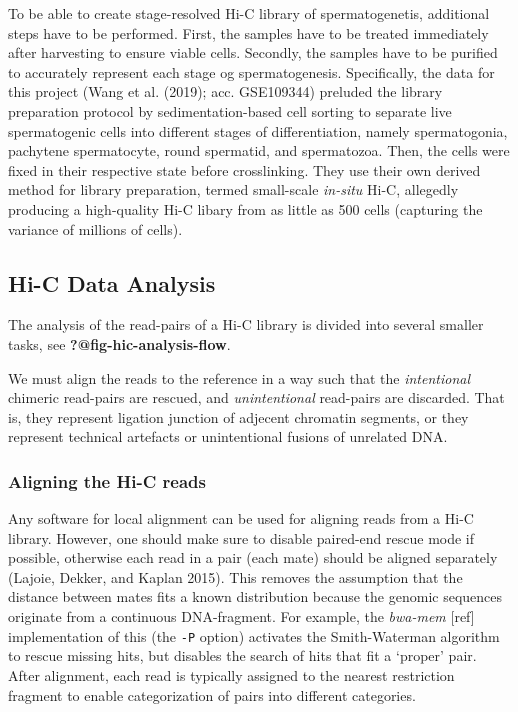 \documentclass[
  11pt,
  a4paper,
]{scrbook}
\let\oldemph\emph
\renewcommand\emph[1]{\oldemph{\color{gray}#1}}
\begin{document}
To be able to create stage-resolved Hi-C library of spermatogenetis,
additional steps have to be performed. First, the samples have to be
treated immediately after harvesting to ensure viable cells. Secondly,
the samples have to be purified to accurately represent each stage og
spermatogenesis. Specifically, the data for this project (Wang et al.
(2019); acc. GSE109344) preluded the library preparation protocol by
sedimentation-based cell sorting to separate live spermatogenic cells
into different stages of differentiation, namely spermatogonia,
pachytene spermatocyte, round spermatid, and spermatozoa. Then, the
cells were fixed in their respective state before crosslinking. They use
their own derived method for library preparation, termed small-scale
\emph{in-situ} Hi-C, allegedly producing a high-quality Hi-C libary from
as little as 500 cells (capturing the variance of millions of cells).

\subsection{Hi-C Data Analysis}\label{hi-c-data-analysis}

The analysis of the read-pairs of a Hi-C library is divided into several
smaller tasks, see \textbf{?@fig-hic-analysis-flow}.

We must align the reads to the reference in a way such that the
\emph{intentional} chimeric read-pairs are rescued, and
\emph{unintentional} read-pairs are discarded. That is, they represent
ligation junction of adjecent chromatin segments, or they represent
technical artefacts or unintentional fusions of unrelated DNA.

\subsubsection{Aligning the Hi-C reads}\label{aligning-the-hi-c-reads}

Any software for local alignment can be used for aligning reads from a
Hi-C library. However, one should make sure to disable paired-end rescue
mode if possible, otherwise each read in a pair (each mate) should be
aligned separately (Lajoie, Dekker, and Kaplan 2015). This removes the
assumption that the distance between mates fits a known distribution
because the genomic sequences originate from a continuous DNA-fragment.
For example, the \emph{bwa-mem} {[}ref{]} implementation of this (the
\texttt{-P} option) activates the Smith-Waterman algorithm to rescue
missing hits, but disables the search of hits that fit a `proper' pair.
After alignment, each read is typically assigned to the nearest
restriction fragment to enable categorization of pairs into different
categories.
\end{document}
